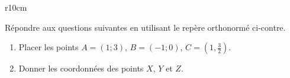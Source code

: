 
\begin{exercice}\label{exoSeconde-0002}

    \begin{wrapfigure}[30]{r}{10cm}
   \vspace{-1cm}        %
   \centering
   
\end{wrapfigure}
    Répondre aux questions suivantes en utilisant le repère orthonormé ci-contre.

    \begin{enumerate}
        \item
            Placer les points \( A=(1;3)\), \( B=(-1;0)\), \( C=(1,\frac{ 3 }{2})\).
        \item
            Donner les coordonnées des points \( X\), \( Y\) et \( Z\).
    \end{enumerate}
    \vspace{1cm}
\end{exercice}
